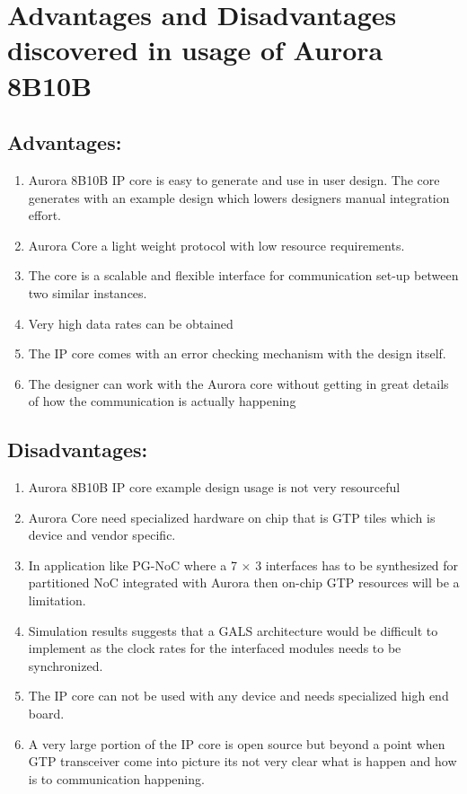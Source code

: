 \section{Advantages and Disadvantages discovered in usage of Aurora 8B10B}
\subsection{Advantages:}
\begin{enumerate}
	\item{Aurora 8B10B IP core is easy to generate and use in user design. The core generates with an example design which lowers designers manual integration effort.}
	\item{Aurora Core a light weight protocol with low resource requirements.}
	\item{The core is a scalable and flexible interface for communication set-up between two similar instances.}
	\item{Very high data rates can be obtained}
	\item{The IP core comes with an error checking mechanism with the design itself.}
	\item{The designer can work with the Aurora core without getting in great details of how the communication is actually happening}
\end{enumerate}


\subsection{Disadvantages:}
\begin{enumerate}
	\item{Aurora 8B10B IP core example design usage is not very resourceful}
	\item{Aurora Core need specialized hardware on chip that is GTP tiles which is device and vendor specific.}
	\item{In application like PG-NoC where a 7 $\times$ 3 interfaces has to be synthesized for partitioned NoC integrated with Aurora then on-chip GTP resources will be a limitation.}
	\item{Simulation results suggests that a GALS architecture would be difficult to implement as the clock rates for the interfaced modules needs to be synchronized.}
	\item{The IP core can not be used with any device and needs specialized high end board.}
	\item{A very large portion of the IP core is open source but beyond a point when GTP transceiver come into picture its not very clear what is happen and how is to communication happening.}
\end{enumerate}


